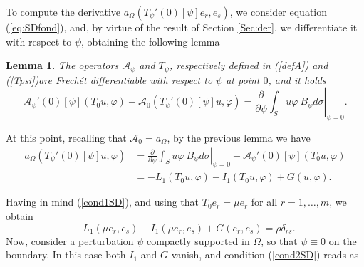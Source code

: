 \documentclass[a4paper,reqno,11pt,oneside]{amsart}
\theoremstyle{plain}
\theoremstyle{plain}
\newtheorem{lemma}[thm]{Lemma}
\theoremstyle{plain}
\theoremstyle{remark}
\begin{document}
To compute the derivative $ a_\Omega  (T_\psi '(0)[\psi] e_r,e_s)$, we consider equation (\ref{eq:SDfond}), and, by virtue of the result of Section \ref{Sec:der}, we differentiate it with respect to $\psi$, obtaining the following lemma
\begin{lemma}\label{lem:diff}
The operators  $\mathcal{A}_\psi$ and $T_\psi$, respectively defined in (\ref{defA}) and (\ref{Tpsi})are Frechét differentiable 
with respect to $\psi$ at point $0$, and it holds
\begin{equation*}
    \mathcal{A}_\psi'(0)[\psi] (T_0 u,\varphi)+
      \mathcal{A}_0 (T_\psi '(0)[\psi] u,\varphi)=\left. \frac{\partial}{\partial \psi}\int_{S}  u\varphi\ B_\psi d\sigma\right|_{\psi=0}.
\end{equation*} 
\end{lemma}
At this point, recalling that $\mathcal{A}_0=a_\Omega$, by the previous lemma we have
\begin{equation}\label{cond1SD}\begin{aligned}
    a_\Omega  (T_\psi '(0)[\psi] u,\varphi)&=
    \left. \frac{\partial}{\partial \psi}\int_{S}  u\varphi\ B_\psi d\sigma\right|_{\psi=0}-
    \mathcal{A}_\psi'(0)[\psi] (T_0 u,\varphi)\\ &=
    -L_1(T_0u, \varphi)-
I_1( T_0u, \varphi)
+G(u,\varphi).
\end{aligned}\end{equation}


Having in mind (\ref{cond1SD}), and using that $T_0e_r=\mu e_r$ for all $r=1,\dots,m$, we obtain
\begin{equation}\label{cond2SD}
    -L_1(\mu e_r,e_s)-
I_1(\mu e_r,e_s)
+G( e_r,e_s)
=\rho\delta_{rs}.
\end{equation}
Now, consider a perturbation $\psi$ compactly supported in $\Omega$, so that $\psi\equiv0$ on the boundary.  In this case both $I_1$ and $G$ vanish, and condition (\ref{cond2SD}) reads as
\end{document}
